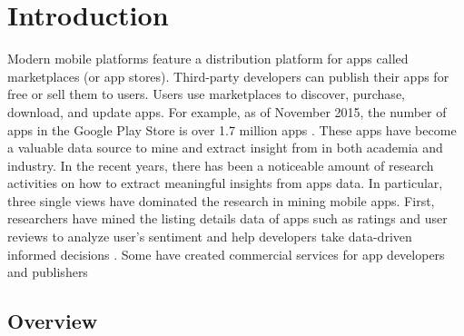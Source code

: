 \chapter{Introduction}
\label{ch:intro__chapter}
Modern mobile platforms feature a distribution platform for apps called marketplaces (or app stores).
Third-party developers can publish their apps for free or sell them to users.
Users use marketplaces to discover, purchase, download, and update apps. For example, as of November 2015, the number of apps in the Google Play Store is over 1.7 million apps \cite{appbrain_play_apps}.
These apps have become a valuable data source to mine and extract insight from in both academia and industry.
In the recent years, there has been a noticeable amount of research activities on how to extract meaningful insights from apps data. 
In particular, three single views have dominated the research in mining mobile apps.
First, researchers have mined the listing details data of apps such as ratings and user reviews to analyze user's sentiment and help developers take data-driven informed decisions \cite{fu_2013_KDD,chen_2014_ICSE,kong_2015_CCS}. 
Some have created commercial services for app developers and publishers \cite{appfigures,applause,appannie}


\section{Overview}